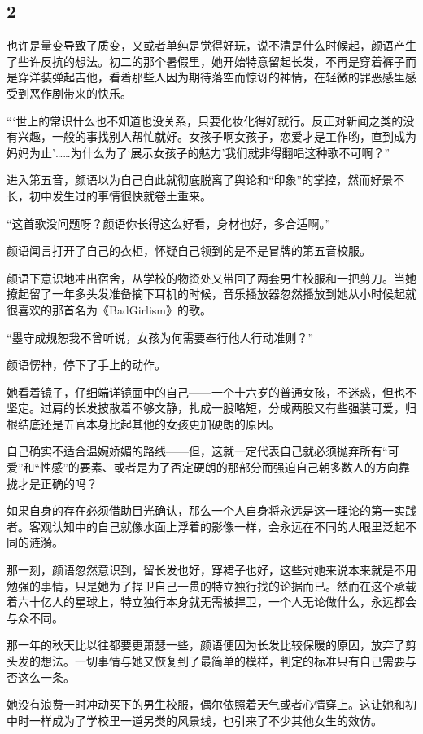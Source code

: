 \documentclass[UTF8, scheme = chinese, openany]{ctexbook}
\begin{document}
\subsection{2}

也许是量变导致了质变，又或者单纯是觉得好玩，说不清是什么时候起，颜语产生了些许反抗的想法。初二的那个暑假里，她开始特意留起长发，不再是穿着裤子而是穿洋装弹起吉他，看着那些人因为期待落空而惊讶的神情，在轻微的罪恶感里感受到恶作剧带来的快乐。

“‘世上的常识什么也不知道也没关系，只要化妆化得好就行。反正对新闻之类的没有兴趣，一般的事找别人帮忙就好。女孩子啊女孩子，恋爱才是工作哟，直到成为妈妈为止’……为什么为了‘展示女孩子的魅力’我们就非得翻唱这种歌不可啊？”

进入第五音，颜语以为自己自此就彻底脱离了舆论和“印象”的掌控，然而好景不长，初中发生过的事情很快就卷土重来。

“这首歌没问题呀？颜语你长得这么好看，身材也好，多合适啊。”

颜语闻言打开了自己的衣柜，怀疑自己领到的是不是冒牌的第五音校服。

颜语下意识地冲出宿舍，从学校的物资处又带回了两套男生校服和一把剪刀。当她撩起留了一年多头发准备摘下耳机的时候，音乐播放器忽然播放到她从小时候起就很喜欢的那首名为《BadGirlism》的歌。

“墨守成规恕我不曾听说，女孩为何需要奉行他人行动准则？”

颜语愣神，停下了手上的动作。

她看着镜子，仔细端详镜面中的自己——一个十六岁的普通女孩，不迷惑，但也不坚定。过肩的长发披散着不够文静，扎成一股略短，分成两股又有些强装可爱，归根结底还是五官本身比起其他的女孩更加硬朗的原因。

自己确实不适合温婉娇媚的路线——但，这就一定代表自己就必须抛弃所有“可爱”和“性感”的要素、或者是为了否定硬朗的那部分而强迫自己朝多数人的方向靠拢才是正确的吗？

如果自身的存在必须借助目光确认，那么一个人自身将永远是这一理论的第一实践者。客观认知中的自己就像水面上浮着的影像一样，会永远在不同的人眼里泛起不同的涟漪。

那一刻，颜语忽然意识到，留长发也好，穿裙子也好，这些对她来说本来就是不用勉强的事情，只是她为了捍卫自己一贯的特立独行找的论据而已。然而在这个承载着六十亿人的星球上，特立独行本身就无需被捍卫，一个人无论做什么，永远都会与众不同。

那一年的秋天比以往都要更萧瑟一些，颜语便因为长发比较保暖的原因，放弃了剪头发的想法。一切事情与她又恢复到了最简单的模样，判定的标准只有自己需要与否这么一条。

她没有浪费一时冲动买下的男生校服，偶尔依照着天气或者心情穿上。这让她和初中时一样成为了学校里一道另类的风景线，也引来了不少其他女生的效仿。
\end{document}
